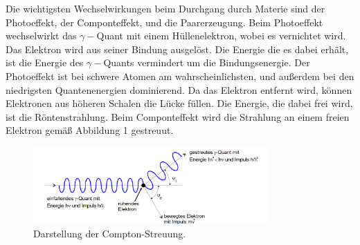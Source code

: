 Die wichtigsten Wechselwirkungen beim Durchgang durch Materie sind der Photoeffekt, der Componteffekt, und die Paarerzeugung.
Beim Photoeffekt wechselwirkt das $\gamma -$Quant mit einem Hüllenelektron, wobei es vernichtet wird. Das Elektron wird aus seiner Bindung ausgelöst.
Die Energie die es dabei erhält, ist die Energie des $\gamma -$Quants vermindert um die Bindungsenergie.
Der Photoeffekt ist bei schwere Atomen am wahrscheinlichsten, und außerdem bei den niedrigsten Quantenenergien dominierend.
Da das Elektron entfernt wird, können Elektronen aus höheren Schalen die Lücke füllen. Die Energie, die dabei frei wird, ist die Röntenstrahlung.
Beim Componteffekt wird die Strahlung an einem freien Elektron gemäß Abbildung 1 gestreuut.
\begin{figure}[H]
  \centering
  \includegraphics[width=0.8\textwidth]{compton.png}
  \caption{Darstellung der Compton-Streuung.\cite[S.5]{kent}}
  \label{fig:aufbau}
\end{figure}

